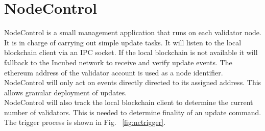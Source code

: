 \section{NodeControl}
\label{nodecontrol}

NodeControl is a small management application that runs on each validator node. It is in charge of carrying out simple update tasks.
It will listen to the local blockchain client via an IPC socket. If the local blockchain is not available it will fallback to the Incubed network to receive and verify update events.
The ethereum address of the validator account is used as a node identifier. NodeControl will only act on events directly directed to its assigned address.
This allows granular deployment of updates. \\

NodeControl will also track the local blockchain client to determine the current number of validators. This is needed to determine finality of an update command.
The trigger process is shown in Fig. ~\ref{fig:nctrigger}.


